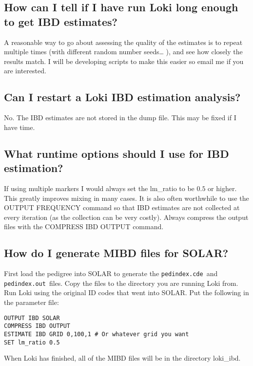 \documentclass[10pt]{article}
\begin{document}
\subsection{How can I tell if I have run Loki long enough to get IBD estimates?}
A reasonable way to go about assessing the quality of the estimates is to
repeat multiple times (with different random number seeds{\ldots} ), and see
how closely the results match.  I will be developing scripts to make this
easier so email me if you are interested.
\subsection{Can I restart a Loki IBD estimation analysis?}
No.  The IBD estimates are not stored in the dump file.  This may be fixed
if I have time.
\subsection{What runtime options should I use for IBD estimation?}
If using multiple markers I would always set the lm\_ratio to be $0.5$ or
higher.  This greatly improves mixing in many cases.  It is also often
worthwhile to use the OUTPUT FREQUENCY command so that IBD estimates are not
collected at every iteration (as the collection can be very costly).  Always
compress the output files with the COMPRESS IBD OUTPUT command.
\subsection{How do I generate MIBD files for SOLAR?}
First load the pedigree into SOLAR to generate the \verb+pedindex.cde+\ and
\verb+pedindex.out+\ files.  Copy the files to the directory you are running
Loki from.  Run Loki using the original ID codes that went into SOLAR.  Put
the following in the parameter file:
\begin{verbatim}
OUTPUT IBD SOLAR
COMPRESS IBD OUTPUT
ESTIMATE IBD GRID 0,100,1 # Or whatever grid you want
SET lm_ratio 0.5
\end{verbatim}
When Loki has finished, all of the MIBD files will be in the directory
loki\_ibd.
\end{document}
